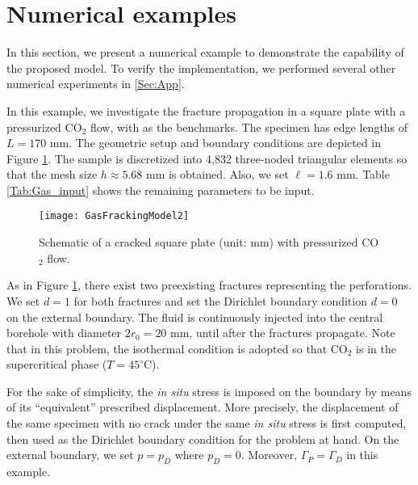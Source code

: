 \section{Numerical examples}
\label{sec:num-examples}
In this section, we present a numerical example to demonstrate the capability of the proposed model. To verify the implementation, we performed several other numerical experiments in \ref{Sec:App}.

In this example, we investigate the fracture propagation in a square plate with a pressurized CO$_2$ flow, with \cite{ishida2016features, wang2018influence} as the benchmarks. The specimen has edge lengths of $L=170$ mm. The geometric setup and boundary conditions are depicted in Figure \ref{Fig:Gas_geometry}. The sample is discretized into 4,832 three-noded triangular elements so that the mesh size $h\approx 5.68$ mm is obtained. Also, we set $\ell=1.6$ mm. Table \ref{Tab:Gas_input} shows the remaining parameters to be input.

\begin{figure}[htbp]
	\centering
	\texttt{[image: GasFrackingModel2]}
	\caption{Schematic of a cracked square plate (unit: mm) with pressurized CO$_2$ flow.}
	\label{Fig:Gas_geometry}
\end{figure}

As in Figure \ref{Fig:Gas_geometry}, there exist two preexisting fractures representing the perforations. We set $d=1$ for both fractures and set the Dirichlet boundary condition $d=0$ on the external boundary. The fluid is continuously injected into the central borehole with diameter $2r_0=20$ mm, until after the fractures propagate. Note that in this problem, the isothermal condition is adopted so that CO$_2$ is in the supercritical phase ($T=45^{\circ}$C).


For the sake of simplicity, the \emph{in situ} stress is imposed on the boundary by means of its ``equivalent'' prescribed displacement. More precisely, the displacement of the same specimen with no crack under the same \emph{in situ} stress is first computed, then used as the Dirichlet boundary condition for the problem at hand. On the external boundary, we set $p=p_D$ where $p_D=0$. Moreover, $\Gamma_P=\Gamma_D$ in this example.

